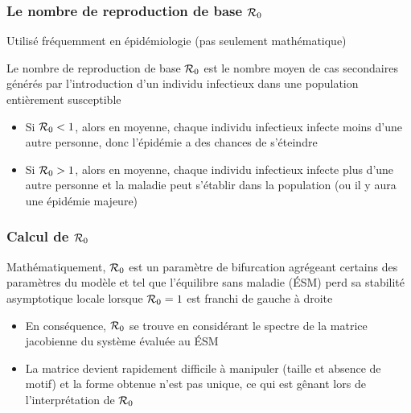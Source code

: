 \documentclass[aspectratio=169]{beamer}\usepackage[]{graphicx}\usepackage[]{xcolor}
\begin{document}

\nocite{VdDWatmough2002}


\begin{frame}
\frametitle{Le nombre de reproduction de base $\mathcal{R}_0$}
Utilisé fréquemment en épidémiologie (pas seulement mathématique)
\begin{definition}[$R_0$]
Le nombre de reproduction de base $\mathcal{R}_0$ est le nombre moyen de cas secondaires générés par l'introduction d'un individu infectieux dans une population entièrement susceptible
\end{definition}
\begin{itemize}
\item Si $\mathcal{R}_0<1$, alors en moyenne, chaque individu infectieux infecte moins d'une autre personne, donc l'épidémie a des chances de s'éteindre
\item Si $\mathcal{R}_0>1$, alors en moyenne, chaque individu infectieux infecte plus d'une autre personne et la maladie peut s'établir dans la population (ou il y aura une épidémie majeure)
\end{itemize}
\end{frame}

\begin{frame}\frametitle{Calcul de $\mathcal{R}_0$}
Mathématiquement, $\mathcal{R}_0$ est un paramètre de bifurcation agrégeant certains des paramètres du modèle et tel que l'équilibre sans maladie (ÉSM) perd sa stabilité asymptotique locale lorsque $\mathcal{R}_0=1$ est franchi de gauche à droite
\vfill
\begin{itemize}
\item
En conséquence, $\mathcal{R}_0$ se trouve en considérant le spectre de la matrice jacobienne du système évaluée au ÉSM
\vfill
\item
La matrice devient rapidement difficile à manipuler (taille et absence de \guillemetleft motif\guillemetright) et la forme obtenue n'est pas unique, ce qui est gênant lors de l'interprétation de $\mathcal{R}_0$
\end{itemize}
\end{frame}
\end{document}
